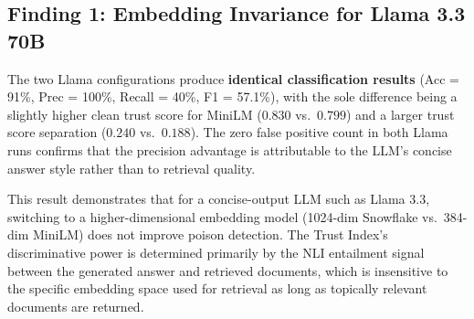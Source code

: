 \begin{table}[h]
\centering
\caption{2×2 factorial grid results --- TruthfulQA, 100 samples, mixed strategy.}
\label{tab:grid_results}
\end{table}

\subsection{Finding 1: Embedding Invariance for Llama 3.3 70B}

The two Llama configurations produce \textbf{identical classification results}
(Acc = 91\%, Prec = 100\%, Recall = 40\%, F1 = 57.1\%), with the sole difference being a
slightly higher clean trust score for MiniLM ($0.830$ vs.\ $0.799$) and a larger trust
score separation ($0.240$ vs.\ $0.188$). The zero false positive count in both Llama runs
confirms that the precision advantage is attributable to the LLM's concise answer style
rather than to retrieval quality.

This result demonstrates that for a concise-output LLM such as Llama 3.3, switching to a
higher-dimensional embedding model (1024-dim Snowflake vs.\ 384-dim MiniLM) does not
improve poison detection. The Trust Index's discriminative power is determined primarily
by the NLI entailment signal between the generated answer and retrieved documents, which
is insensitive to the specific embedding space used for retrieval as long as topically
relevant documents are returned.

